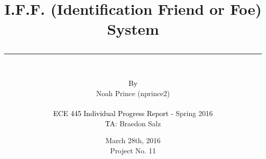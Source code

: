 \documentclass[letterpaper,10pt]{article}
\author{\vspace{.4in}\\
	\textcolor{black}{By}\\
	#1
	\vspace{1in}\\
	\textcolor{black}{ECE 445 Individual Progress Report -} #2\\
	\textcolor{black}{TA:} #3
	\vspace{1in}}
\newcommand{\thetitle}[1]{\title{\begin{huge}{\bf #1}\end{huge} \color{subtitlecolor}\rule[25pt]{\textwidth}{1pt}}}
\newcommand{\theauthor}[3]{
	\author{\vspace{.4in}\\
	\textcolor{black}{By}\\
	#1
	\vspace{1in}\\
	\textcolor{black}{ECE 445 Individual Progress Report -} #2\\
	\textcolor{black}{TA:} #3
	\vspace{1in}}
}
\begin{document}
\pagestyle{empty}
\doublespacing

\thetitle{{I.F.F. (Identification Friend or Foe) System}}

\theauthor{
	{Noah Prince (nprince2)}\\
}
{ %
	{Spring 2016}
}
{ %
	{Braedon Salz}
}

\date{
{March 28th, 2016}\\
Project No. 11
\clearpage
}

\maketitle
\pagestyle{fancy}
\end{document}
